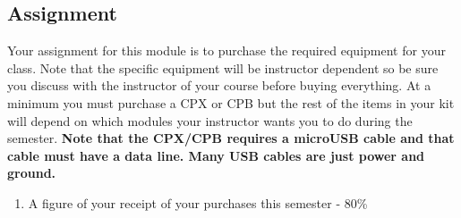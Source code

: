 \subsection{Assignment}
Your assignment for this module is to purchase the required equipment for your class. Note that the specific equipment will be instructor dependent so be sure you discuss with the instructor of your course before buying everything. At a minimum you must purchase a CPX or CPB but the rest of the items in your kit will depend on which modules your instructor wants you to do during the semester. {\bf Note that the CPX/CPB requires a microUSB cable and that cable must have a data line. Many USB cables are just power and ground.}



\begin{enumerate}[itemsep=-5pt]
\item A figure of your receipt of your purchases this semester - 80\%
\end{enumerate}



